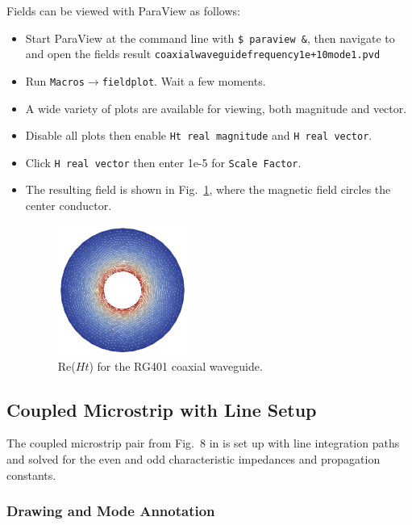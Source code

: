 \documentclass[titlepage]{article}
\renewcommand\_{\textunderscore\linebreak[1]}
\begin{document}
Fields can be viewed with ParaView as follows:
\begin{itemize}
\item Start ParaView at the command line with \verb+$ paraview &+, then navigate to and open the fields result \newline \texttt{coaxial\_waveguide\_frequency\_1e+10\_mode\_1.pvd}
\item Run \texttt{Macros}$\rightarrow$\texttt{field\_plot}.  Wait a few moments.
\item A wide variety of plots are available for viewing, both magnitude and vector.
\item Disable all plots then enable \texttt{Ht real magnitude} and \texttt{H real vector}.
\item Click \texttt{H real vector} then enter 1e-5 for \texttt{Scale Factor}.
\item The resulting field is shown in Fig.~\ref{fig:coaxial_ReHt}, where the magnetic field circles the center conductor.
\begin{figure}[H]
  \centering
  \includegraphics[width=0.4\textwidth]{../tutorials/OpenParEM2D/coaxial_waveguide/screenshots/coaxial_ReHt}
  \caption{Re($Ht$) for the RG401 coaxial waveguide.}
  \label{fig:coaxial_ReHt}
\end{figure}
\end{itemize}

\subsection{Coupled Microstrip with Line Setup}
\label{sec:coupled_microstrip}

The coupled microstrip pair from Fig.~8 in \cite{Olyslager} is set up with line integration paths and solved for the even and odd characteristic impedances and propagation constants.

\subsubsection{Drawing and Mode Annotation}
\end{document}
